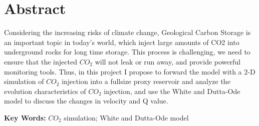 

\chapter{Abstract}


Considering the increasing risks of climate change, Geological Carbon Storage is an important topic in today’s world,
which inject large amounts of CO2 into underground rocks for long time storage.
This process is challenging, we need to ensure that the injected $CO_2$ will not leak or run away, and provide powerful monitoring tools.
Thus, in this project I propose to forward the model with a 2-D simulation of $CO_2$ injection into a fullsize proxy reservoir and 
 analyze the evolution characteristics of $CO_2$ injection,
 and use the White and Dutta-Ode model to discuss the changes in velocity and Q value.

{\large\textbf{Key Words:}} $CO_2$ simulation; White and Dutta-Ode model